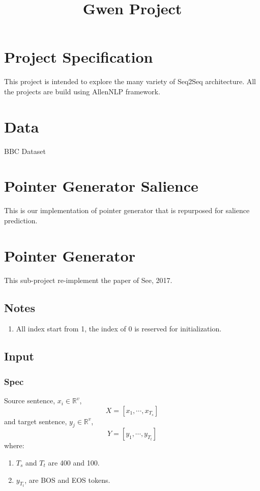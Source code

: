 \documentclass{article}
\title{Gwen Project}
\begin{document}
\section{Project Specification}
  This project is intended to explore the many variety of Seq2Seq architecture.
  All the projects are build using AllenNLP framework.
\section{Data}
  BBC Dataset
\section{Pointer Generator Salience}
  This is our implementation of pointer generator that is repurposed for salience prediction.

\section{Pointer Generator}
  This sub-project re-implement the paper of See, 2017.
  \subsection{Notes}
  \begin{enumerate}
    \item All index start from 1, the index of 0 is reserved for initialization.
  \end{enumerate}
  \subsection{Input}
  \subsubsection{Spec}
  Source sentence, $x_i \in \mathbb{R}^v$,
  \[
    X = [x_1, \cdots, x_{T_s}]
  \] and target sentence, $y_j \in \mathbb{R}^v$,
  \[
    Y = [y_1, \cdots, y_{T_t}]
  \]
  where:
  \begin{enumerate}
    \item $T_s$ and $T_t$ are 400 and 100.
    \item $y_{T_t}$, are BOS and EOS tokens.
  \end{enumerate}
\end{document}
